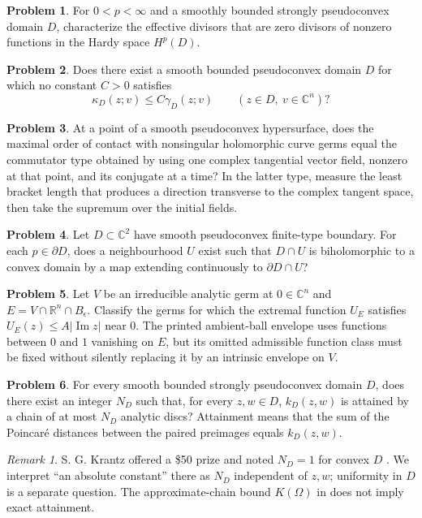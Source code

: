 \documentclass[11pt,reqno]{amsart}
\theoremstyle{definition}
\newtheorem{problem}{Problem}[section]
\theoremstyle{remark}
\newtheorem*{remark}{Remark}
\begin{document}
\begin{problem}\label{b95-5-6-2}
For $0<p<\infty$ and a smoothly bounded strongly pseudoconvex domain $D$, characterize the effective divisors that are zero divisors of nonzero functions in the Hardy space $H^p(D)$.
\end{problem}


\begin{problem}\label{b95-7-3-2}
Does there exist a smooth bounded pseudoconvex domain $D$ for which no constant $C>0$ satisfies
\[
 \kappa_D(z;v)\leq C\gamma_D(z;v)
 \qquad(z\in D,\ v\in\mathbb C^n)?
\]
\end{problem}


\begin{problem}\label{b95-7-4-1}
At a point of a smooth pseudoconvex hypersurface, does the maximal order of contact with nonsingular holomorphic curve germs equal the commutator type obtained by using one complex tangential vector field, nonzero at that point, and its conjugate at a time? In the latter type, measure the least bracket length that produces a direction transverse to the complex tangent space, then take the supremum over the initial fields.
\end{problem}


\begin{problem}\label{b95-7-4-2}
Let $D\subset\mathbb C^2$ have smooth pseudoconvex finite-type boundary. For each $p\in\partial D$, does a neighbourhood $U$ exist such that $D\cap U$ is biholomorphic to a convex domain by a map extending continuously to $\partial D\cap U$?
\end{problem}


\begin{problem}\label{b95-8-2-1}
Let $V$ be an irreducible analytic germ at $0\in\mathbb C^n$ and $E=V\cap\mathbb R^n\cap B_\epsilon$. Classify the germs for which the extremal function $U_E$ satisfies
$U_E(z)\leq A|\operatorname{Im}z|$ near $0$. The printed ambient-ball envelope uses functions between $0$ and $1$ vanishing on $E$, but its omitted admissible function class must be fixed without silently replacing it by an intrinsic envelope on $V$.
\end{problem}


\begin{problem}\label{b95-14-1}
For every smooth bounded strongly pseudoconvex domain $D$, does there exist an integer $N_D$ such that, for every $z,w\in D$, $k_D(z,w)$ is attained by a chain of at most $N_D$ analytic discs? Attainment means that the sum of the Poincar\'e distances between the paired preimages equals $k_D(z,w)$.
\end{problem}
\begin{remark}
S. G. Krantz offered a \$50 prize and noted $N_D=1$ for convex $D$ \cite[Prize Problem~1]{B95}. We interpret ``an absolute constant'' there as $N_D$ independent of $z,w$; uniformity in $D$ is a separate question. The approximate-chain bound $K(\Omega)$ in \cite[Theorem~18 of the 2009 preprint]{B95-Krantz2012} does not imply exact attainment.
\end{remark}
\end{document}
